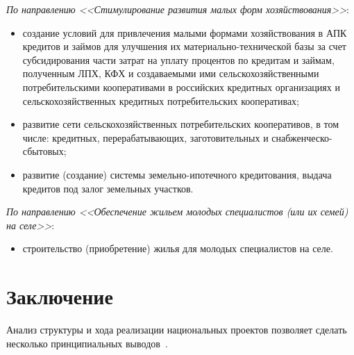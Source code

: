 \documentclass[article, 12pt, russian, oneside]{ncc}
\begin{document}
\emph{По направлению <<Стимулирование развития малых форм
  хозяйствования>>}:

\begin{itemize}
\item создание условий для привлечения малыми формами хозяйствования в
  АПК кредитов и займов для улучшения их материально-технической базы
  за счет субсидирования части затрат на уплату процентов по кредитам
  и займам, полученным ЛПХ, КФХ и создаваемыми ими
  сельскохозяйственными потребительскими кооперативами в российских
  кредитных организациях и сельскохозяйственных кредитных
  потребительских кооперативах;
\item развитие сети сельскохозяйственных потребительских кооперативов,
  в том числе: кредитных, перерабатывающих, заготовительных и
  снаб\-жен\-чес\-ко-сбытовых;
\item развитие (создание) системы земельно-ипотечного кредитования,
  выдача кредитов под залог земельных участков.
\end{itemize}

\emph{По направлению <<Обеспечение жильем молодых специалистов (или их
  семей) на селе>>}:

\begin{itemize}
\item строительство (приобретение) жилья для молодых специалистов на
  селе.
\end{itemize}
\newpage

\noheadingtag
\section{Заключение}

Анализ структуры и хода реализации национальных проектов позволяет
сделать несколько принципиальных выводов~\cite{Spero}.
\end{document}
